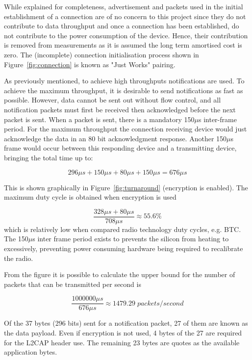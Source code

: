 \documentclass[]{article}
\begin{document}
While explained for completeness, advertisement and packets used in the initial establishment of a connection are of no concern to this project since they do not contribute to data throughput and once a connection has been established, do not contribute to the power consumption of the device. Hence, their contribution is removed from measurements as it is assumed the long term amortised cost is zero. The (incomplete) connection initialisation process shown in Figure~\ref{fig:connection} is known as "Just Works" pairing.



As previously mentioned, to achieve high throughputs notifications are used. To achieve the maximum throughput, it is desirable to send notifications as fast as possible. However, data cannot be sent out without flow control, and all notification packets must first be received then acknowledged before the next packet is sent. When a packet is sent, there is a mandatory 150$\mu$s inter-frame period. For the maximum throughput the connection receiving device would just acknowledge the data in an 80 bit acknowledgment response. Another 150$\mu$s frame would occur between this responding device and a transmitting device, bringing the total time up to:

\begin{displaymath}
296\mu s + 150\mu s + 80\mu s + 150\mu s = 676\mu s
\end{displaymath}

 This is shown graphically in Figure~\ref{fig:turnaround} (encryption is enabled). The maximum duty cycle is obtained when encryption is used 

\begin{displaymath}
\frac{328\mu s + 80\mu s}{708\mu s} \approx 55.6\%
\end{displaymath}
which is relatively low when compared radio technology duty cycles, e.g. \ac{BTC}. The 150$\mu$s inter frame period exists to prevents the silicon from heating to excessively, preventing power consuming hardware being required to recalibrate the radio. 

From the figure it is possible to calculate the upper bound for the number of packets that can be transmitted per second is

\begin{displaymath}\frac{1000000\mu s}{676\mu s} \approx  1479.29\;packets/second\end{displaymath}

Of the 37 bytes (296 bits) sent for a notification packet, 27 of them are known as the data payload. Even if encryption is not used, 4 bytes of the 27 are required for the L2CAP header use. The remaining 23 bytes are quotes as the available application bytes.
\end{document}
